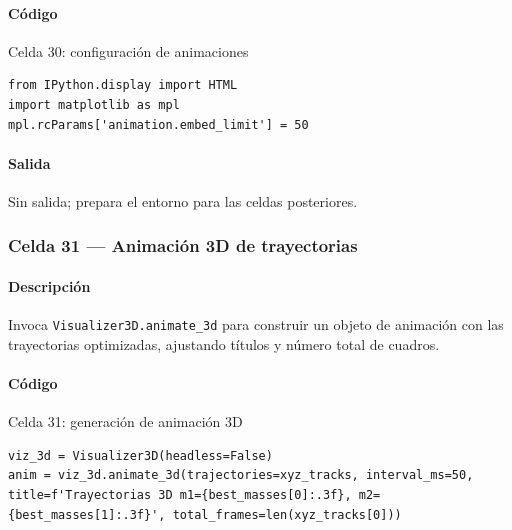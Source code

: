 \paragraph{Código}
\begin{listing}[H]
\caption{Celda 30: configuración de animaciones}
\label{lst:c04_cell30}
\begin{adjustbox}{max width=\textwidth}
\begin{minipage}{\textwidth}
\begin{verbatim}
from IPython.display import HTML
import matplotlib as mpl
mpl.rcParams['animation.embed_limit'] = 50
\end{verbatim}
\end{minipage}
\end{adjustbox}
\end{listing}
\paragraph{Salida} Sin salida; prepara el entorno para las celdas posteriores.

\subsubsection*{Celda 31 — Animación 3D de trayectorias}
\paragraph{Descripción} Invoca \texttt{Visualizer3D.animate\_3d} para construir un objeto de animación con las trayectorias optimizadas, ajustando títulos y número total de cuadros.
\paragraph{Código}
\begin{listing}[H]
\caption{Celda 31: generación de animación 3D}
\label{lst:c04_cell31}
\begin{adjustbox}{max width=\textwidth}
\begin{minipage}{\textwidth}
\begin{verbatim}
viz_3d = Visualizer3D(headless=False)
anim = viz_3d.animate_3d(trajectories=xyz_tracks, interval_ms=50, title=f'Trayectorias 3D m1={best_masses[0]:.3f}, m2={best_masses[1]:.3f}', total_frames=len(xyz_tracks[0]))
\end{verbatim}
\end{minipage}
\end{adjustbox}
\end{listing}
